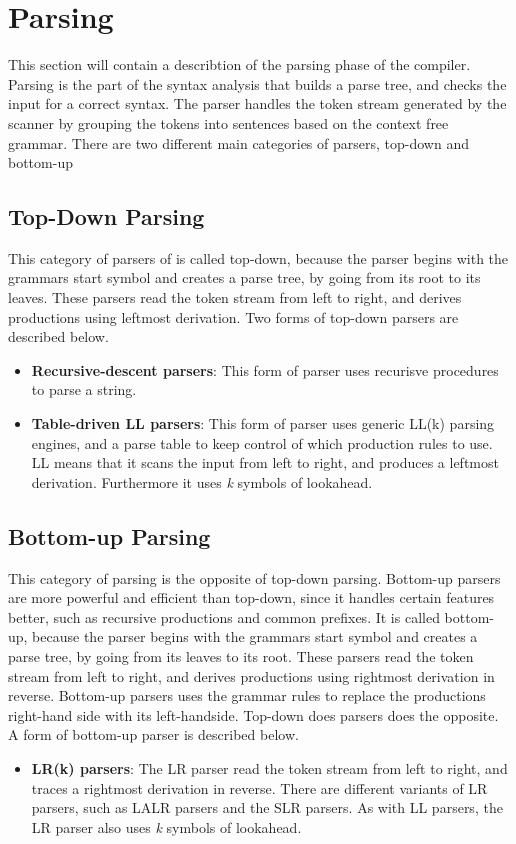 \section{Parsing}
This section will contain a describtion of the parsing phase of the compiler. 
\\Parsing is the part of the syntax analysis that builds a parse tree, and checks the input for a correct syntax. The parser handles the token stream generated by the scanner by grouping the tokens into sentences based on the context free grammar. There are two different main categories of parsers, top-down and bottom-up

\subsection{Top-Down Parsing}
This category of parsers of is called top-down, because the parser begins with the grammars start symbol and creates a parse tree, by going from its root to its leaves. These parsers read the token stream from left to right, and derives productions using leftmost derivation. Two forms of top-down parsers are described below. 

\begin{itemize}
\item \textbf{Recursive-descent parsers}: This form of parser uses recurisve procedures to parse a string. 
\item \textbf{Table-driven LL parsers}: This form of parser uses generic LL(k) parsing engines, and a parse table to keep control of which production rules to use. LL means that it scans the input from left to right, and produces a leftmost derivation. Furthermore it uses \textit{k} symbols of lookahead. 
\end{itemize}

\subsection{Bottom-up Parsing}
This category of parsing is the opposite of top-down parsing. Bottom-up parsers are more powerful and efficient than top-down, since it handles certain features better, such as recursive productions and common prefixes. It is called bottom-up, because the parser begins with the grammars start symbol and creates a parse tree, by going from its leaves to its root. These parsers read the token stream from left to right, and derives productions using rightmost derivation in reverse. Bottom-up parsers uses the grammar rules to replace the productions right-hand side with its left-handside. Top-down does parsers does the opposite. A form of bottom-up parser is described below. 

\begin{itemize}
\item \textbf{LR(k) parsers}: The LR parser read the token stream from left to right, and traces a rightmost derivation in reverse. There are different variants of LR parsers, such as LALR parsers and the SLR parsers. As with LL parsers, the LR parser also uses \textit{k} symbols of lookahead.  
\end{itemize}
